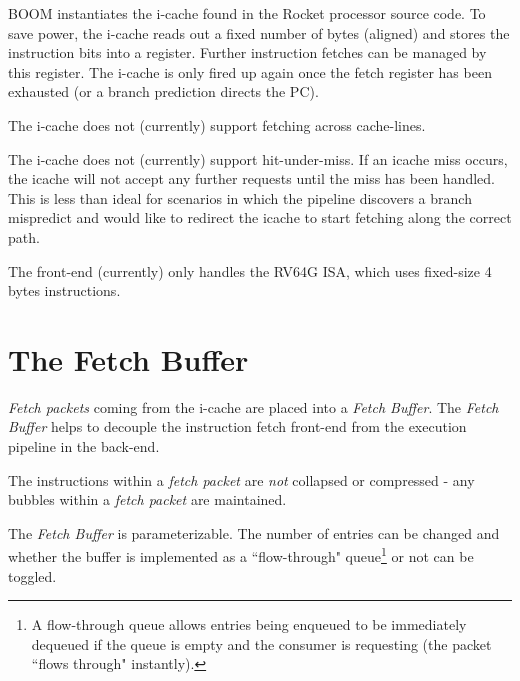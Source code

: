 BOOM instantiates the i-cache found in the Rocket processor source code.  To save power, the i-cache reads out a fixed number of bytes (aligned) and stores the instruction bits into a register. Further instruction fetches can be managed by this register. The i-cache is only fired up again once the fetch register has been exhausted (or a branch prediction directs the PC). 

The i-cache does not (currently) support fetching across cache-lines.

The i-cache does not (currently) support hit-under-miss.  If an icache miss occurs, the icache will not accept any further requests until the miss has been handled.  This is less than ideal for scenarios in which the pipeline discovers a branch mispredict and would like to redirect the icache to start fetching along the correct path. 

The front-end (currently) only handles the RV64G ISA, which uses fixed-size 4 bytes instructions. 

\section{The Fetch Buffer}

{\em Fetch packets} coming from the i-cache are placed into a {\em Fetch Buffer}.  The {\em Fetch Buffer} helps to decouple the instruction fetch front-end from the execution pipeline in the back-end. 

The instructions within a {\em fetch packet} are {\em not} collapsed or compressed - any bubbles within a {\em fetch packet} are maintained. 

The {\em Fetch Buffer} is parameterizable. The number of entries can be changed and whether the buffer is implemented as a ``flow-through" queue\footnote{A flow-through queue allows entries being enqueued to be immediately dequeued if the queue is empty and the consumer is requesting (the packet ``flows through" instantly).} or not can be toggled.  